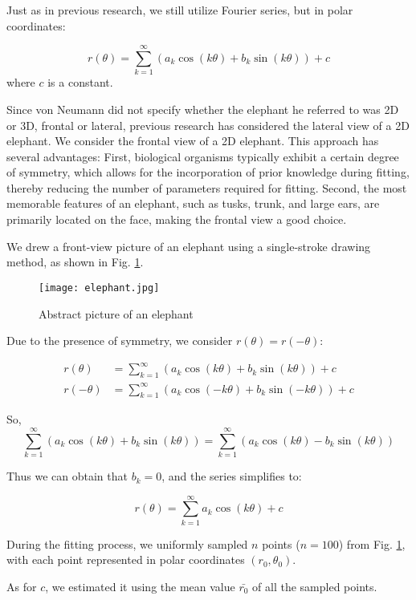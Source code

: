 \documentclass{article}
\begin{document}
Just as in previous research, we still utilize Fourier series, but in polar coordinates:

$$
r(\theta) = \sum_{k=1}^{\infty} \left( a_k \cos(k\theta) + b_k \sin(k\theta) \right) + c
$$
where $c$ is a constant.


Since von Neumann did not specify whether the elephant he referred to was 2D or 3D, frontal or lateral, previous research has considered the lateral view of a 2D elephant. We consider the frontal view of a 2D elephant. This approach has several advantages: First, biological organisms typically exhibit a certain degree of symmetry, which allows for the incorporation of prior knowledge during fitting, thereby reducing the number of parameters required for fitting. Second, the most memorable features of an elephant, such as tusks, trunk, and large ears, are primarily located on the face, making the frontal view a good choice.

We drew a front-view picture of an elephant using a single-stroke drawing method, as shown in Fig. \ref{fig:elephant}.


\begin{figure}[h]
	\centering
	\texttt{[image: elephant.jpg]}
	\caption{Abstract picture of an elephant}
	\label{fig:elephant}
\end{figure}


Due to the presence of symmetry, we consider \( r(\theta) = r(-\theta) \):

\begin{align*}
	r(\theta) &= \sum_{k=1}^{\infty} \left( a_k \cos(k\theta) + b_k \sin(k\theta) \right) + c \\
	r(-\theta) &= \sum_{k=1}^{\infty} \left( a_k \cos(-k\theta) + b_k \sin(-k\theta) \right) + c
\end{align*}


So,
$$
\sum_{k=1}^{\infty} \left( a_k \cos(k\theta) + b_k \sin(k\theta) \right) = \sum_{k=1}^{\infty} \left( a_k \cos(k\theta) - b_k \sin(k\theta) \right)
$$

Thus we can obtain that $b_k = 0$, and the series simplifies to:

$$
r(\theta) = \sum_{k=1}^{\infty} a_k \cos(k\theta) + c
$$


During the fitting process, we uniformly sampled $ n $ points ($ n = 100 $) from Fig. \ref{fig:elephant}, with each point represented in polar coordinates $(r_0, \theta_0)$.

As for $ c $, we estimated it using the mean value $\bar{r_0}$ of all the sampled points.
\end{document}
